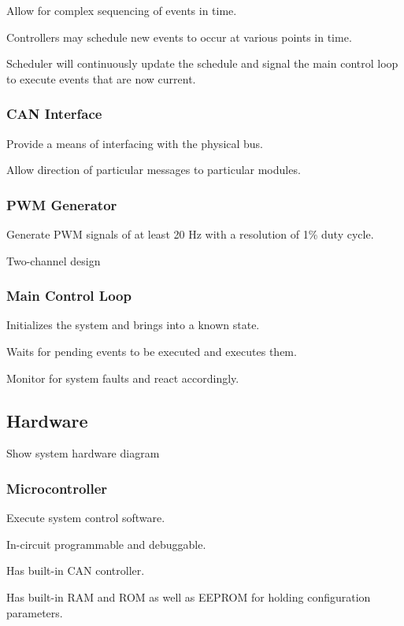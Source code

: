 Allow for complex sequencing of events in time.

Controllers may schedule new events to occur at various points in
time.

Scheduler will continuously update the schedule and signal the main
control loop to execute events that are now current.


\subsubsection{CAN Interface}

Provide a means of interfacing with the physical bus. 

Allow direction of particular messages to particular modules.


\subsubsection{PWM Generator}

Generate PWM signals of at least 20 Hz with a resolution of 1\% duty
cycle.

Two-channel design


\subsubsection{Main Control Loop}

Initializes the system and brings into a known state.

Waits for pending events to be executed and executes them.

Monitor for system faults and react accordingly.


\subsection{Hardware}

Show system hardware diagram


\subsubsection{Microcontroller}

Execute system control software.

In-circuit programmable and debuggable.

Has built-in CAN controller.

Has built-in RAM and ROM as well as EEPROM for holding configuration
parameters.


